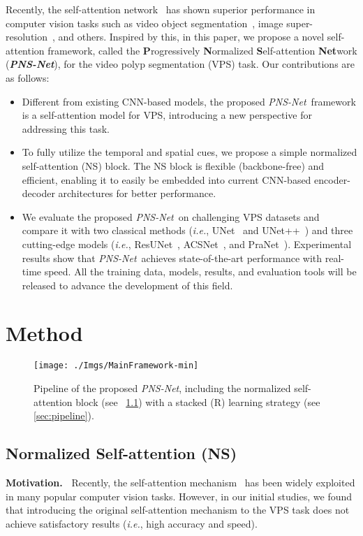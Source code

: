 \documentclass[runningheads]{llncs}
\newcommand{\secref}[1]{ \ref{#1}}
\def\ie{\emph{i.e.}}
\def\ourmodel{\textit{PNS-Net}}
\newcommand{\myPara}[1]{\noindent\textbf{#1~}}
\begin{document}
Recently, the self-attention network~\cite{wang2018non} has shown superior performance in computer vision tasks such as video object segmentation~\cite{gu2020pyramid}, image super-resolution~\cite{yang2020learning}, and others.
Inspired by this, in this paper, we propose a novel self-attention framework, called the \textbf{P}rogressively \textbf{N}ormalized \textbf{S}elf-attention \textbf{Net}work (\textbf{\ourmodel}), for the video polyp segmentation (VPS) task. 
Our contributions are as follows:
\begin{itemize}
    \item[] Different from existing CNN-based models, the proposed \ourmodel~framework is a self-attention model for VPS, introducing a new perspective for addressing this task. 
    
    \item[] To fully utilize the temporal and spatial cues, we propose a simple normalized self-attention (NS) block. The NS block is flexible (backbone-free) and efficient, enabling it to easily be embedded into current CNN-based encoder-decoder architectures for better performance.
\item[] We evaluate the proposed \ourmodel~on challenging VPS datasets and compare it with two classical methods (\ie, UNet~\cite{ronneberger2015u} and UNet++~\cite{zhou2018unetplus}) and three cutting-edge models (\ie, ResUNet~\cite{jha2019resunetplus}, ACSNet~\cite{zhang2020adaptive}, and PraNet~\cite{fan2020pra}). Experimental results show that \ourmodel~achieves state-of-the-art performance with real-time speed. All the training data, models, results, and evaluation tools will be released to advance the development of this field.
\end{itemize}




\section{Method}

\begin{figure}[!t]
  \centering
\texttt{[image: ./Imgs/MainFramework-min]}
  \caption{
    Pipeline of the proposed \ourmodel, including the normalized self-attention block (see~\secref{sec:NS}) with a stacked (R) learning strategy (see~\secref{sec:pipeline}).
  }\label{fig:main_framework}
\end{figure}


\subsection{Normalized Self-attention (NS)}\label{sec:NS}
\myPara{Motivation.} 
Recently, the self-attention mechanism~\cite{wang2018non} has been widely exploited in many popular computer vision tasks. 
However, in our initial studies, we found that introducing the original self-attention mechanism to the VPS task does not achieve satisfactory results (\ie, high accuracy and speed).  
\end{document}
